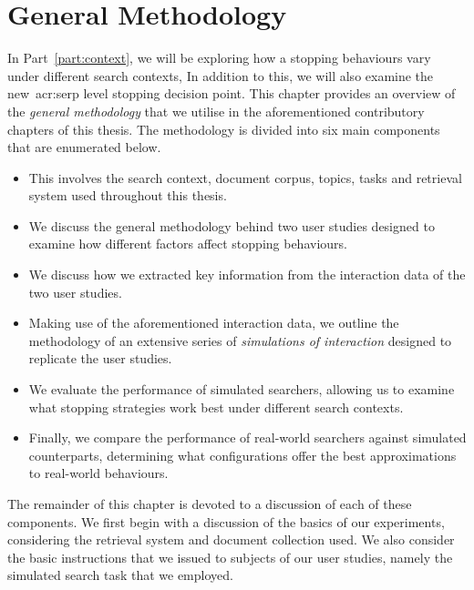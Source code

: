 
\chapter[General Methodology]{General Methodology}\label{chap:method}
In Part~\ref{part:context}, we will be exploring how a stopping behaviours vary under different search contexts, In addition to this, we will also examine the new~\gls{acr:serp} level stopping decision point. This chapter provides an overview of the \emph{general methodology} that we utilise in the aforementioned contributory chapters of this thesis. The methodology is divided into six main components that are enumerated below.

\begin{itemize}
    \item{ This involves the search context, document corpus, topics, tasks and retrieval system used throughout this thesis.}
    \item{ We discuss the general methodology behind two user studies designed to examine how different factors affect stopping behaviours.}
    \item{ We discuss how we extracted key information from the interaction data of the two user studies.}
    \item{ Making use of the aforementioned interaction data, we outline the methodology of an extensive series of \emph{simulations of interaction} designed to replicate the user studies.}
    \item{ We evaluate the performance of simulated searchers, allowing us to examine what stopping strategies work best under different search contexts.}
    \item{ Finally, we compare the performance of real-world searchers against simulated counterparts, determining what configurations offer the best approximations to real-world behaviours.}
\end{itemize}

The remainder of this chapter is devoted to a discussion of each of these components. We first begin with a discussion of the basics of our experiments, considering the retrieval system and document collection used. We also consider the basic instructions that we issued to subjects of our user studies, namely the simulated search task that we employed.

